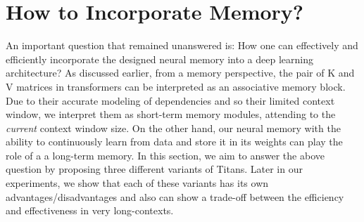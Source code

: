 \section{How to Incorporate Memory?}\label{sec:arch}
\lettrine[lines=3]{A}{}n important question that remained unanswered is: How one can effectively and efficiently incorporate the designed neural memory into a deep learning architecture? As discussed earlier, from a memory perspective, the pair of K and V matrices in transformers can be interpreted as an associative memory block. Due to their accurate modeling of dependencies and so their limited context window, we interpret them as short-term memory modules, attending to the \emph{current} context window size. On the other hand, our neural memory with the ability to continuously learn from data and store it in its weights can play the role of a a long-term memory. In this section, we aim to answer the above question by proposing three different variants of Titans. Later in our experiments, we show that each of these variants has its own advantages/disadvantages and also can show a trade-off between the efficiency and effectiveness in very long-contexts. 





